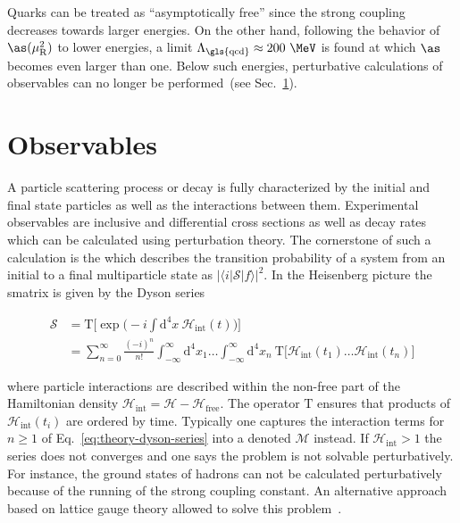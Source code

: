 Quarks can be treated as ``asymptotically free'' since the strong coupling decreases towards larger energies. On the other hand, following the behavior of $\as(\mu^2_\mathrm{R})$ to lower energies, a limit $\Lambda_\mathrm{\gls{qcd}}\approx 200~\MeV$ is found at which $\as$ becomes even larger than one. Below such energies, perturbative calculations of observables can no longer be performed~(see Sec.~\ref{sec:theory-observables}). 





\section{Observables}
\label{sec:theory-observables}

A particle scattering process or decay is fully characterized by the initial and final state particles as well as the interactions between them. Experimental observables are inclusive and differential cross sections as well as decay rates which can be calculated using perturbation theory. The cornerstone of such a calculation is the  which describes the transition probability of a system from an initial to a final multiparticle state as $|\langle i|\mathcal{S}|f\rangle|^{2}$. In the Heisenberg picture the \gls{smatrix} is given by the Dyson series

\begin{align}
\mathcal{S}&=\mathrm{T}\Big[\exp\Big(-i\int\mathrm{d}^{4}x~\mathcal{H}_\mathrm{int}(t)\Big)\Big]\\
&=\sum_{n=0}^{\infty}\frac{(-i)^{n}}{n!}\int_{-\infty}^{\infty}\mathrm{d}^{4}x_{1}\ldots \int_{-\infty}^{\infty}\mathrm{d}^{4}x_{n}~\mathrm{T}\Big[\mathcal{H}_\mathrm{int}(t_{1})\ldots\mathcal{H}_\mathrm{int}(t_{n})\Big] \label{eq:theory-dyson-series}
\end{align}

where particle interactions are described within the non-free part of the Hamiltonian density $\mathcal{H}_\mathrm{int}=\mathcal{H}-\mathcal{H}_\mathrm{free}$. The operator $\mathrm{T}$ ensures that products of $\mathcal{H}_\mathrm{int}(t_{i})$ are ordered by time. Typically one captures the interaction terms for $n\geq1$ of Eq.~\ref{eq:theory-dyson-series} into a  denoted $\mathcal{M}$ instead. If $\mathcal{H}_\mathrm{int}>1$ the series does not converges and one says the problem is not solvable perturbatively. For instance, the ground states of hadrons can not be calculated perturbatively because of the running of the strong coupling constant. An alternative approach based on lattice gauge theory allowed to solve this problem~\cite{Durr:2008zz}.

